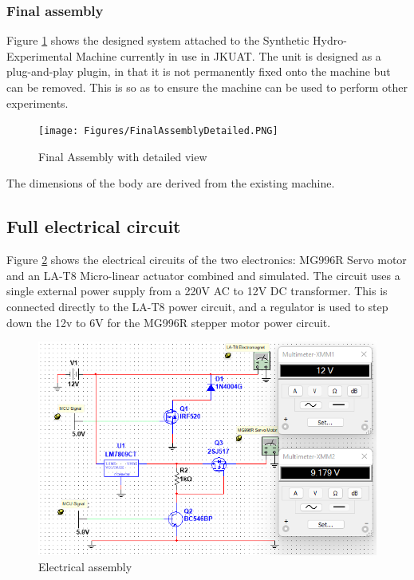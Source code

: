 \subsubsection{Final assembly}
Figure \ref{fig:final assembly} shows the designed system attached to the Synthetic Hydro-Experimental Machine currently in use in JKUAT. The unit is designed as a plug-and-play plugin, in that it is not permanently fixed onto the machine but can  be removed. This is so as to ensure the machine can be used to perform other experiments.
\begin{figure}[H]
    \centering
    \texttt{[image: Figures/FinalAssemblyDetailed.PNG]}
    \caption{Final Assembly with detailed view}
    \label{fig:final assembly}
\end{figure}
 The dimensions of the body are derived from the existing machine.
 \subsection{Full electrical circuit}
Figure \ref{fig:electrical_assembly} shows the electrical circuits of the two electronics: MG996R Servo motor and an LA-T8 Micro-linear actuator combined and simulated. The circuit uses a single external power supply from a 220V AC to 12V DC transformer. This is connected directly to the LA-T8 power circuit, and a regulator is used to step down the 12v to 6V for the MG996R stepper motor power circuit.
 \begin{figure}[H]
     \centering
     \includegraphics{Figures/FinalPartCircuit.png}
     \caption{Electrical assembly}
     \label{fig:electrical_assembly}
 \end{figure}

 
